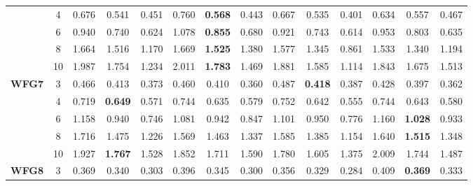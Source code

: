 \documentclass[onecolumn,10pt]{asme2ej}
\begin{document}
\begin{table}[!htb]
\begin{tabular}{|c|c|c|c|c|c|c|c|c|c|c|c|c|c|}
	& 4          & 0.676         & 0.541          & 0.451          & 0.760         & \textbf{0.568} & 0.443          & 0.667         & 0.535          & 0.401          & 0.634         & 0.557          & 0.467          \\ \cline{2-14} 
	& 6          & 0.940         & 0.740          & 0.624          & 1.078         & \textbf{0.855} & 0.680          & 0.921         & 0.743          & 0.614          & 0.953         & 0.803          & 0.635          \\ \cline{2-14} 
	& 8          & 1.664         & 1.516          & 1.170          & 1.669         & \textbf{1.525} & 1.380          & 1.577         & 1.345          & 0.861          & 1.533         & 1.340          & 1.194          \\ \cline{2-14} 
	& 10         & 1.987         & 1.754          & 1.234          & 2.011         & \textbf{1.783} & 1.469          & 1.881         & 1.585          & 1.114          & 1.843         & 1.675          & 1.513          \\ \hline
	\multirow{5}{*}{\textbf{WFG7}} & 3          & 0.466         & 0.413          & 0.373          & 0.460         & 0.410          & 0.360          & 0.487         & \textbf{0.418} & 0.387          & 0.428         & 0.397          & 0.362          \\ \cline{2-14} 
	& 4          & 0.719         & \textbf{0.649} & 0.571          & 0.744         & 0.635          & 0.579          & 0.752         & 0.642          & 0.555          & 0.744         & 0.643          & 0.580          \\ \cline{2-14} 
	& 6          & 1.158         & 0.940          & 0.746          & 1.081         & 0.942          & 0.847          & 1.101         & 0.950          & 0.776          & 1.160         & \textbf{1.028} & 0.933          \\ \cline{2-14} 
	& 8          & 1.716         & 1.475          & 1.226          & 1.569         & 1.463          & 1.337          & 1.585         & 1.385          & 1.154          & 1.640         & \textbf{1.515} & 1.348          \\ \cline{2-14} 
	& 10         & 1.927         & \textbf{1.767} & 1.528          & 1.852         & 1.711          & 1.590          & 1.780         & 1.605          & 1.375          & 2.009         & 1.744          & 1.487          \\ \hline
	\multirow{5}{*}{\textbf{WFG8}} & 3          & 0.369         & 0.340          & 0.303          & 0.396         & 0.345          & 0.300          & 0.356         & 0.329          & 0.284          & 0.409         & \textbf{0.369} & 0.333          \\ \cline{2-14} 

\end{tabular}
\end{table}
\end{document}
